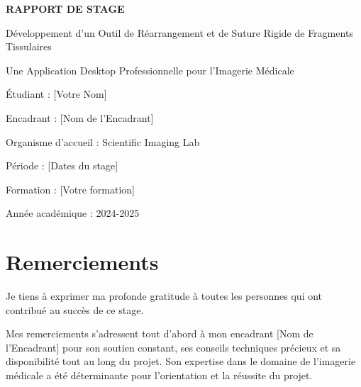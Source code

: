 \documentclass[12pt,a4paper]{article}
\begin{document}
\begin{titlepage}
\centering

\vspace*{1cm}

{\LARGE \textbf{RAPPORT DE STAGE}}

\vspace{1cm}

{\Large Développement d'un Outil de Réarrangement et de Suture Rigide de Fragments Tissulaires}

\vspace{1cm}

{\large Une Application Desktop Professionnelle pour l'Imagerie Médicale}

\vspace{2cm}

{\large Étudiant : [Votre Nom]}

\vspace{0.5cm}

{\large Encadrant : [Nom de l'Encadrant]}

\vspace{0.5cm}

{\large Organisme d'accueil : Scientific Imaging Lab}

\vspace{0.5cm}

{\large Période : [Dates du stage]}

\vspace{0.5cm}

{\large Formation : [Votre formation]}

\vspace{0.5cm}

{\large Année académique : 2024-2025}

\vfill

\end{titlepage}

\tableofcontents
\newpage

\section*{Remerciements}

Je tiens à exprimer ma profonde gratitude à toutes les personnes qui ont contribué au succès de ce stage.

Mes remerciements s'adressent tout d'abord à mon encadrant [Nom de l'Encadrant] pour son soutien constant, ses conseils techniques précieux et sa disponibilité tout au long du projet. Son expertise dans le domaine de l'imagerie médicale a été déterminante pour l'orientation et la réussite du projet.
\end{document}
